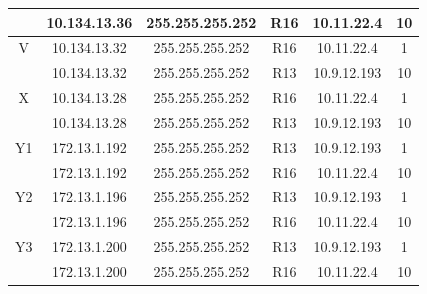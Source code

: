 \documentclass[12pt, a4paper, spanish]{article}
\begin{document}
\begin{center}
\begin{tabular}{|c|c|c|c|c|c|}
	 & 10.134.13.36 & 255.255.255.252 & R16 & 10.11.22.4 & 10\\
	\hline
	V & 10.134.13.32 & 255.255.255.252 & R16 & 10.11.22.4 & 1\\
	 & 10.134.13.32 & 255.255.255.252 & R13 & 10.9.12.193 & 10\\
	\hline
	X & 10.134.13.28 & 255.255.255.252 & R16 & 10.11.22.4 & 1\\
	 & 10.134.13.28 & 255.255.255.252 & R13 & 10.9.12.193 & 10\\
	\hline
	Y1 & 172.13.1.192 & 255.255.255.252 & R13 & 10.9.12.193 & 1\\
	 & 172.13.1.192 & 255.255.255.252 & R16 & 10.11.22.4 & 10\\
	\hline
	Y2 & 172.13.1.196 & 255.255.255.252 & R13 & 10.9.12.193 & 1\\
	 & 172.13.1.196 & 255.255.255.252 & R16 & 10.11.22.4 & 10\\
	\hline
	Y3 & 172.13.1.200 & 255.255.255.252 & R13 & 10.9.12.193 & 1\\
	 & 172.13.1.200 & 255.255.255.252 & R16 & 10.11.22.4 & 10\\
	\hline
\end{tabular}
\end{center}
\end{document}
